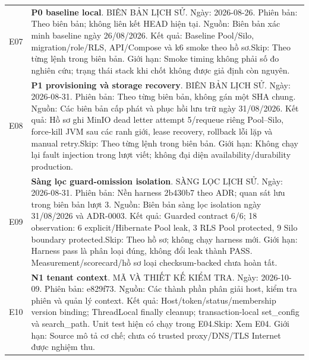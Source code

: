 \begin{longtable}{@{}P{.11\textwidth}P{.79\textwidth}@{}}
\label{ev:E07}E07 & \textbf{P0 baseline local}. BIÊN BẢN LỊCH SỬ. \newline Ngày: 2026-08-26. Phiên bản: Theo biên bản; không liên kết HEAD hiện tại. \newline Nguồn: Biên bản xác minh baseline ngày 26/08/2026. \newline Kết quả: Baseline Pool\slash Silo, migration\slash role\slash RLS, API\slash Compose và k6 smoke theo hồ sơ.\newline Skip: Theo từng lệnh trong biên bản. \newline Giới hạn: Smoke timing không phải số đo nghiên cứu; trạng thái stack khi chốt không được giả định còn nguyên. \\
\label{ev:E08}E08 & \textbf{P1 provisioning và storage recovery}. BIÊN BẢN LỊCH SỬ. \newline Ngày: 2026-08-31. Phiên bản: Theo từng biên bản, không gán một SHA chung. \newline Nguồn: Các biên bản cấp phát và phục hồi lưu trữ ngày 31/08/2026. \newline Kết quả: Hồ sơ ghi MinIO dead letter attempt 5\slash requeue riêng Pool–Silo, force-kill JVM sau các ranh giới, lease recovery, rollback lỗi lặp và manual retry.\newline Skip: Theo từng lệnh trong biên bản. \newline Giới hạn: Không chạy lại fault injection trong lượt viết; không đại diện availability\slash durability production. \\
\label{ev:E09}E09 & \textbf{Sàng lọc guard-omission isolation}. SÀNG LỌC LỊCH SỬ. \newline Ngày: 2026-08-31. Phiên bản: Nền harness 2b430b7 theo ADR; quan sát lưu trong biên bản lượt 3. \newline Nguồn: Biên bản sàng lọc isolation ngày 31/08/2026 và ADR-0003. \newline Kết quả: Guarded contract 6\slash 6; 18 observation: 6 explicit\slash Hibernate Pool leak, 3 RLS Pool protected, 9 Silo boundary protected.\newline Skip: Theo hồ sơ; không chạy harness mới. \newline Giới hạn: Harness pass là phân loại đúng, không đổi leak thành PASS. Measurement\slash scorecard\slash hồ sơ loại checksum-backed chưa hoàn tất. \\
\label{ev:E10}E10 & \textbf{N1 tenant context}. MÃ VÀ THIẾT KẾ KIỂM TRA. \newline Ngày: 2026-10-09. Phiên bản: e829f73. \newline Nguồn: Các thành phần phân giải host, kiểm tra phiên và quản lý context. \newline Kết quả: Host\slash token\slash status\slash membership version binding; ThreadLocal finally cleanup; transaction-local set\_config và search\_path. Unit test hiện có chạy trong E04.\newline Skip: Xem E04. \newline Giới hạn: Source mô tả cơ chế; chưa có trusted proxy\slash DNS\slash TLS Internet được nghiệm thu. \\

\end{longtable}
